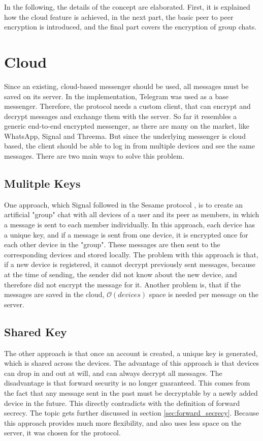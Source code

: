 \documentclass[a4paper, oneside]{discothesis}
\begin{document}
In the following, the details of the concept are elaborated. First, it is explained how the cloud feature is achieved, in the next part, the basic peer to peer encryption is introduced, and the final part covers the encryption of group chats.

\section{Cloud}

Since an existing, cloud-based messenger should be used, all messages must be saved on its server. In the implementation, Telegram was used as a base messenger. Therefore, the protocol needs a custom client, that can encrypt and decrypt messages and exchange them with the server. So far it resembles a generic end-to-end encrypted messenger, as there are many on the market, like WhatsApp, Signal and Threema. But since the underlying messenger is cloud based, the client should be able to log in from multiple devices and see the same messages. There are two main ways to solve this problem.

\subsection{Mulitple Keys}

One approach, which Signal followed in the Sesame protocol \cite{Sesame}, is to create an artificial "group" chat with all devices of a user and its peer as members, in which a message is sent to each member individually. In this approach, each device has a unique key, and if a message is sent from one device, it is encrypted once for each other device in the "group". These messages are then sent to the corresponding devices and stored locally. The problem with this approach is that, if a new device is registered, it cannot decrypt previously sent messages, because at the time of sending, the sender did not know about the new device, and therefore did not encrypt the message for it. Another problem is, that if the messages are saved in the cloud, $\mathcal{O}(devices)$ space is needed per message on the server.

\subsection{Shared Key}

The other approach is that once an account is created, a unique key is generated, which is shared across the devices. The advantage of this approach is that devices can drop in and out at will, and can always decrypt all messages. The disadvantage is that forward security is no longer guaranteed. This comes from the fact that any message sent in the past must be decryptable by a newly added device in the future. This directly contradicts with the definition of forward secrecy. The topic gets further discussed in section \ref{sec:forward_secrecy}. Because this approach provides much more flexibility, and also uses less space on the server, it was chosen for the protocol.
\end{document}
